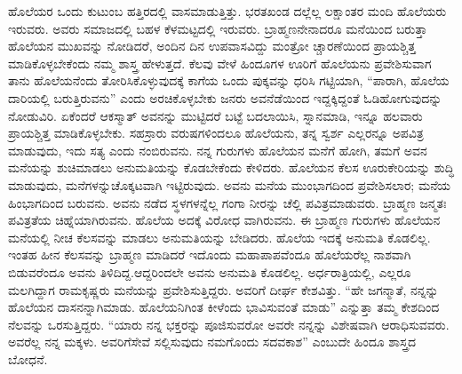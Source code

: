 ಹೊಲೆಯರ ಒಂದು ಕುಟುಂಬ ಹತ್ತಿರದಲ್ಲಿ ವಾಸಮಾಡುತ್ತಿತ್ತು. ಭರತಖಂಡ ದಲ್ಲೆಲ್ಲ ಲಕ್ಷಾಂತರ ಮಂದಿ ಹೊಲೆಯರು ಇರುವರು. ಅವರು ಸಮಾಜದಲ್ಲಿ ಬಹಳ ಕೆಳಮಟ್ಟದಲ್ಲಿ ಇರುವರು. ಬ್ರಾಹ್ಮಣನೇನಾದರೂ ಮನೆಯಿಂದ ಬರುತ್ತಾ ಹೊಲೆಯನ ಮುಖವನ್ನು ನೋಡಿದರೆ, ಅಂದಿನ ದಿನ ಉಪವಾಸವಿದ್ದು ಮಂತ್ರೋ ಚ್ಚಾರಣೆಯಿಂದ ಪ್ರಾಯಶ್ಚಿತ್ತ ಮಾಡಿಕೊಳ್ಳಬೇಕೆಂದು ನಮ್ಮ ಶಾಸ್ತ್ರ ಹೇಳುತ್ತದೆ. ಕೆಲವು ವೇಳೆ ಹಿಂದೂಗಳ ಊರಿಗೆ ಹೊಲೆಯನು ಪ್ರವೇಶಿಸುವಾಗ ತಾನು ಹೊಲೆಯನೆಂದು ತೋರಿಸಿಕೊಳ್ಳುವುದಕ್ಕೆ ಕಾಗೆಯ ಒಂದು ಪುಕ್ಕವನ್ನು ಧರಿಸಿ ಗಟ್ಟಿಯಾಗಿ, “ಪಾರಾಗಿ, ಹೊಲೆಯ ದಾರಿಯಲ್ಲಿ ಬರುತ್ತಿರುವನು” ಎಂದು ಅರಚಿಕೊಳ್ಳಬೇಕು ಜನರು ಅವನೆಡೆಯಿಂದ ಇದ್ದಕ್ಕಿದ್ದಂತೆ ಓಡಿಹೋಗುವುದನ್ನು ನೋಡುವಿರಿ. ಏಕೆಂದರೆ ಆಕಸ್ಮಾತ್​ ಅವನನ್ನು ಮುಟ್ಟಿದರೆ ಬಟ್ಟೆ ಬದಲಾಯಿಸಿ, ಸ್ನಾನಮಾಡಿ, ಇನ್ನೂ ಹಲವಾರು ಪ್ರಾಯಶ್ಚಿತ್ತ ಮಾಡಿಕೊಳ್ಳಬೇಕು. ಸಹಸ್ರಾರು ವರುಷಗಳಿಂದಲೂ ಹೊಲೆಯನು, ತನ್ನ ಸ್ವರ್ಶ ಎಲ್ಲರನ್ನೂ ಅಪವಿತ್ರ ಮಾಡುವುದು, ಇದು ಸತ್ಯ ಎಂದು ನಂಬಿರುವನು. ನನ್ನ ಗುರುಗಳು ಹೊಲೆಯನ ಮನೆಗೆ ಹೋಗಿ, ತಮಗೆ ಅವನ ಮನೆಯನ್ನು ಶುಚಿಮಾಡಲು ಅನುಮತಿಯನ್ನು ಕೊಡಬೇಕೆಂದು ಕೇಳಿದರು. ಹೊಲೆಯನ ಕೆಲಸ ಊರುಕೇರಿಯನ್ನು ಶುದ್ಧಿ ಮಾಡುವುದು, ಮನೆಗಳನ್ನುಚೊಕ್ಕಟವಾಗಿ ಇಟ್ಟಿರುವುದು. ಅವನು ಮನೆಯ ಮುಂಭಾಗದಿಂದ ಪ್ರವೇಶಿಸಲಾರ; ಮನೆಯ ಹಿಂಭಾಗದಿಂದ ಬರುವನು. ಅವನು ನಡೆದ ಸ್ಥಳಗಳನ್ನೆಲ್ಲ ಗಂಗಾ ನೀರನ್ನು ಚೆಲ್ಲಿ ಪವಿತ್ರಮಾಡುವರು. ಬ್ರಾಹ್ಮಣ ಜನ್ಮತಃ ಪವಿತ್ರತೆಯ ಚಿಹ್ನೆಯಾಗಿರುವನು. ಹೊಲೆಯ ಅದಕ್ಕೆ ವಿರೋಧ ವಾಗಿರುವನು. ಈ ಬ್ರಾಹ್ಮಣ ಗುರುಗಳು ಹೊಲೆಯನ ಮನೆಯಲ್ಲಿ ನೀಚ ಕೆಲಸವನ್ನು ಮಾಡಲು ಅನುಮತಿಯನ್ನು ಬೇಡಿದರು. ಹೊಲೆಯ ಇದಕ್ಕೆ ಅನುಮತಿ ಕೊಡಲಿಲ್ಲ. ಇಂತಹ ಹೀನ ಕೆಲಸವನ್ನು ಬ್ರಾಹ್ಮಣ ಮಾಡಿದರೆ ಇದೊಂದು ಮಹಾಪಾಪವೆಂದೂ ಹೊಲೆಯರೆಲ್ಲ ನಾಶವಾಗಿ ಬಿಡುವರೆಂದೂ ಅವನು ತಿಳಿದಿದ್ದ.ಆದ್ದರಿಂದಲೇ ಅವನು ಅನುಮತಿ ಕೊಡಲಿಲ್ಲ. ಅರ್ಧರಾತ್ರಿಯಲ್ಲಿ, ಎಲ್ಲರೂ ಮಲಗಿದ್ದಾಗ ರಾಮಕೃಷ್ಣರು ಮನೆಯನ್ನು ಪ್ರವೇಶಿಸುತ್ತಿದ್ದರು. ಅವರಿಗೆ ದೀರ್ಘ ಕೇಶವಿತ್ತು. “ಹೇ ಜಗನ್ಮಾತೆ, ನನ್ನನ್ನು ಹೊಲೆಯನ ದಾಸನನ್ನಾಗಿಮಾಡು. ಹೊಲೆಯನಿಗಿಂತ ಕೀಳೆಂದು ಭಾವಿಸುವಂತೆ ಮಾಡು” ಎನ್ನುತ್ತಾ ತಮ್ಮ ಕೇಶದಿಂದ ನೆಲವನ್ನು ಒರಸುತ್ತಿದ್ದರು. “ಯಾರು ನನ್ನ ಭಕ್ತರನ್ನು ಪೂಜಿಸುವರೋ ಅವರೇ ನನ್ನನ್ನು ವಿಶೇಷವಾಗಿ ಆರಾಧಿಸುವವರು. ಅವರೆಲ್ಲ ನನ್ನ ಮಕ್ಕಳು. ಅವರಿಗೆಸೇವೆ ಸಲ್ಲಿಸುವುದು ನಮಗೊಂದು ಸದವಕಾಶ” ಎಂಬುದೇ ಹಿಂದೂ ಶಾಸ್ತ್ರದ ಬೋಧನೆ.

